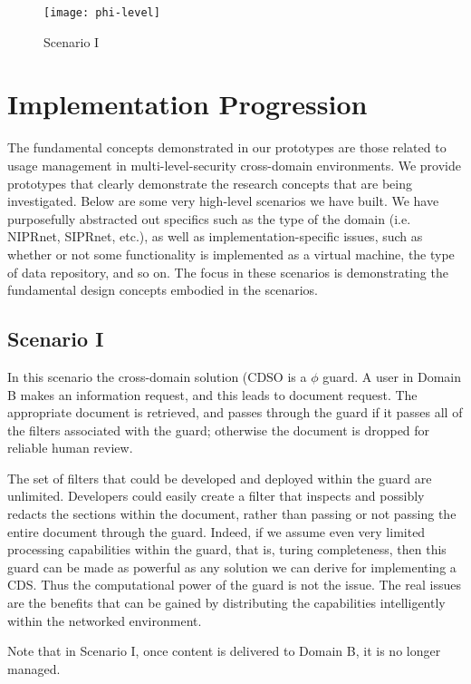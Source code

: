 \begin{figure}[!t]
\centering
\texttt{[image: phi-level]}
\caption{Scenario I}
\label{fig:model:phi-level}
\end{figure}

\section{Implementation Progression}
The fundamental concepts demonstrated in our prototypes are those related to usage management in multi-level-security cross-domain environments. We provide prototypes that clearly demonstrate the research concepts that are being investigated. Below are some very high-level scenarios we have built. We have purposefully abstracted out specifics such as the type of the domain (i.e. NIPRnet, SIPRnet, etc.), as well as implementation-specific issues, such as whether or not some functionality is implemented as a virtual machine, the type of data repository, and so on. The focus in these scenarios is demonstrating the fundamental design concepts embodied in the scenarios.

\subsection{Scenario I}
In this scenario the cross-domain solution (CDSO is a $\phi$ guard. A user in Domain B makes an information request, and this leads to document request. The appropriate document is retrieved, and passes through the guard if it passes all of the filters associated with the guard; otherwise the document is dropped for reliable human review.

The set of filters that could be developed and deployed within the guard are unlimited.  Developers could easily create a filter that inspects and possibly redacts the sections within the document, rather than passing or not passing the entire document through the guard.  Indeed, if we assume even very limited processing capabilities within the guard, that is, turing completeness, then this guard can be made as powerful as any solution we can derive for implementing a CDS. Thus the computational power of the guard is not the issue. The real issues are the benefits that can be gained by distributing the capabilities intelligently within the networked environment.

Note that in Scenario I, once content is delivered to Domain B, it is no longer managed.


